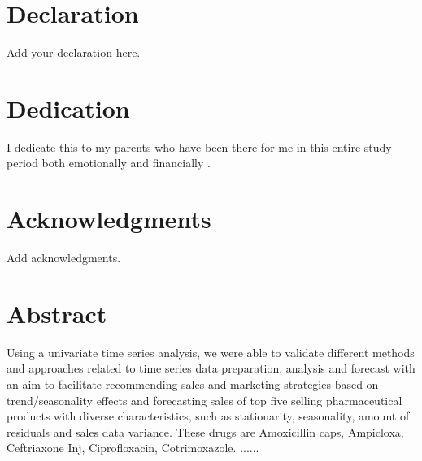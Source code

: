 \documentclass[12pt]{report}
\begin{document}
				



\section*{Declaration}

Add your declaration here.



\newpage


\section*{Dedication}

\vspace{2cm}
\begin{center}
I dedicate this to my parents who have been there for me in this entire study period both emotionally and financially .
\end{center}



\newpage

\section*{Acknowledgments}

Add acknowledgments. 


\lipsum[2-4]



\newpage



\section*{Abstract}


Using a univariate time series analysis, we were able to validate different methods and approaches related to time series data preparation, analysis and forecast with an aim to facilitate recommending sales and marketing strategies based on trend/seasonality effects and forecasting sales of top five selling pharmaceutical products with diverse characteristics, such as stationarity, seasonality, amount of residuals and sales data variance. These drugs are Amoxicillin caps, Ampicloxa, Ceftriaxone Inj, Ciprofloxacin, Cotrimoxazole. 
......
\end{document}
